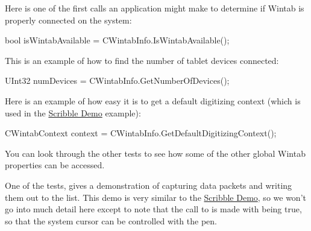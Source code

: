 Here is one of the first calls an application might make to determine if Wintab is properly connected on the system: 
\begin{DoxyCode}
        bool isWintabAvailable = CWintabInfo.IsWintabAvailable();
\end{DoxyCode}


This is an example of how to find the number of tablet devices connected: 
\begin{DoxyCode}
        UInt32 numDevices = CWintabInfo.GetNumberOfDevices();
\end{DoxyCode}


Here is an example of how easy it is to get a default digitizing context (which is used in the \hyperlink{page2_scribbleDemo_sec}{Scribble Demo} example): 
\begin{DoxyCode}
        CWintabContext context = CWintabInfo.GetDefaultDigitizingContext();
\end{DoxyCode}


You can look through the other tests to see how some of the other global Wintab properties can be accessed.

One of the tests, {} gives a demonstration of capturing data packets and writing them out to the list. This demo is very similar to the \hyperlink{page2_scribbleDemo_sec}{Scribble Demo}, so we won't go into much detail here except to note that the call to {} is made with {} being true, so that the system cursor can be controlled with the pen. 